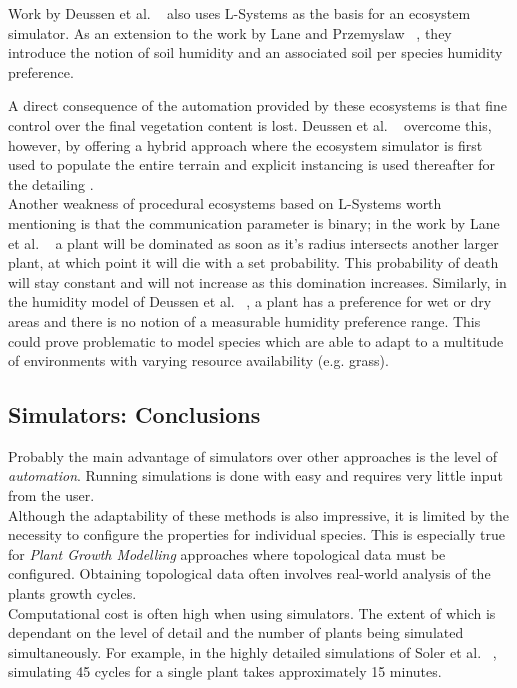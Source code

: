 Work by Deussen et al. ~\cite{Deussen1998} also uses L-Systems as the basis for an ecosystem simulator. As an extension to the work by Lane and Przemyslaw ~\cite{Lane2002}, they introduce the notion of soil humidity and an associated soil per species humidity preference.

A direct consequence of the automation provided by these ecosystems is that fine control over the final vegetation content is lost. Deussen et al. ~\cite{Deussen1998} overcome this, however, by offering a hybrid approach where the ecosystem simulator is first used to populate the entire terrain and explicit instancing is used thereafter for the detailing .\\

Another weakness of procedural ecosystems based on L-Systems worth mentioning is that the communication parameter is binary; in the work by Lane et al. ~\cite{Lane2002} a plant will be dominated as soon as it’s radius intersects another larger plant, at which point it will die with a set probability. This probability of death will stay constant and will not increase as this domination increases. Similarly, in the humidity model of Deussen et al. ~\cite{Deussen1998}, a plant has a preference for wet or dry areas and there is no notion of a measurable humidity preference range. This could prove problematic to model species which are able to adapt to a multitude of environments with varying resource availability (e.g. grass). \\

\subsection{Simulators: Conclusions}
Probably the main advantage of simulators over other approaches is the level of \textit{automation}. Running simulations is done with easy and requires very little input from the user. \\
Although the adaptability of these methods is also impressive, it is limited by the necessity to configure the properties for individual species. This is especially true for \textit{Plant Growth Modelling} approaches where topological data must be configured. Obtaining topological data often involves real-world analysis of the plants growth cycles. \\
Computational cost is often high when using simulators. The extent of which is dependant on the level of detail and the number of plants being simulated simultaneously. For example, in the highly detailed simulations of Soler et al. ~\cite{Soler2001}, simulating 45 cycles for a single plant takes approximately 15 minutes.\\

